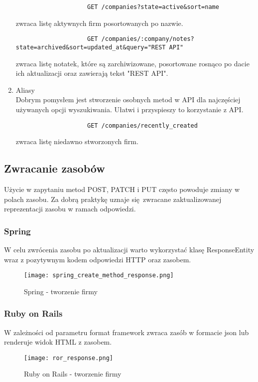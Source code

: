 \begin{enumerate}
				\begin{verbatim}
					GET /companies?state=active&sort=name
				\end{verbatim}
				
				zwraca listę aktywnych firm posortowanych po nazwie. \\
			
				\begin{verbatim}
					GET /companies/:company/notes?state=archived&sort=updated_at&query="REST API"
				\end{verbatim}
				zwraca listę notatek, które są zarchiwizowane, posortowane rosnąco po dacie ich aktualizacji oraz zawierają tekst "REST API".
				
				
				\item{Aliasy} \\
				Dobrym pomysłem jest stworzenie osobnych metod w API dla najczęściej używanych opcji wyszukiwania. Ułatwi i przyspieszy to korzystanie z API.
				
				\begin{verbatim}
					GET /companies/recently_created
				\end{verbatim}
				zwraca listę niedawno stworzonych firm.
			
		\end{enumerate}
	

	\subsection{Zwracanie zasobów}
		Użycie w zapytaniu metod POST, PATCH i PUT często powoduje zmiany w polach zasobu. Za dobrą praktykę uznaje się zwracane zaktualizowanej reprezentacji zasobu w ramach odpowiedzi.
		
		\subsubsection{Spring}
		W celu zwrócenia zasobu po aktualizacji warto wykorzystać klasę ResponseEntity wraz z pozytywnym kodem odpowiedzi HTTP oraz zasobem.
		\begin{figure}[H]
			\begin{center}
				\texttt{[image: spring\_create\_method\_response.png]}
				\caption{\label{fig:spring-create-company} Spring - tworzenie firmy}
			\end{center}
		\end{figure}
	
		\subsubsection{Ruby on Rails}
		W zależności od parametru format framework zwraca zasób w formacie json lub renderuje widok HTML z zasobem.
		\begin{figure}[H]
			\begin{center}
				\texttt{[image: ror\_response.png]}
				\caption{\label{fig:ror-create-company} Ruby on Rails - tworzenie firmy}
			\end{center}
		\end{figure}
	
